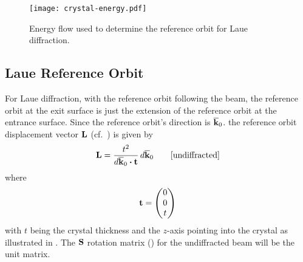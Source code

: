 
\begin{figure}
\centering
\texttt{[image: crystal-energy.pdf]}
  \caption[Reference energy flow for Laue diffraction]{
Energy flow used to determine the reference orbit for Laue diffraction.
  }
\label{f:crystal.energy}
\end{figure}

\subsection{Laue Reference Orbit}
\label{s:laue.ref}

For Laue diffraction, with the reference orbit following the  beam, the reference
orbit at the exit surface is just the extension of the reference orbit at the entrance
surface. Since the reference orbit's direction is $\overline{{\bf k}}_0$.  the reference orbit displacement
vector ${\bf L}$ (cf.~) is given by
\begin{equation}
  {\bf L} = \frac{t^2}{d\overline{{\bf k}}_0 \mathbin{\boldsymbol{\cdot}} {\bf t}} \, d\overline{{\bf k}}_0
  \qquad \text{[undiffracted]}
\end{equation}
where
\begin{equation}
  {\bf t} = \begin{pmatrix}
    0 \\ 0 \\ t
  \end{pmatrix}
\end{equation}
with $t$ being the crystal thickness and the $z$-axis pointing into the crystal as illustrated in
. The ${\bf S}$ rotation matrix () for the undiffracted beam 
will be the unit matrix.

